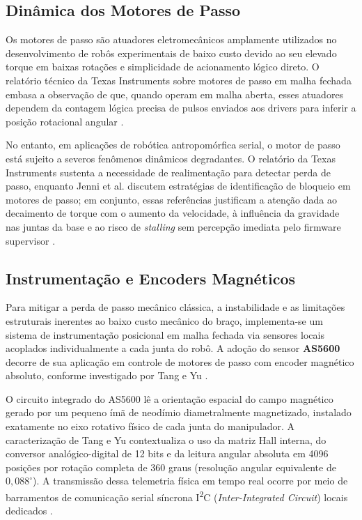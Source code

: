 \subsection{Dinâmica dos Motores de Passo}
\label{subsec:motores_passo}

Os motores de passo são atuadores eletromecânicos amplamente utilizados no desenvolvimento de robôs experimentais de baixo custo devido ao seu elevado torque em baixas rotações e simplicidade de acionamento lógico direto. O relatório técnico da Texas Instruments sobre motores de passo em malha fechada embasa a observação de que, quando operam em malha aberta, esses atuadores dependem da contagem lógica precisa de pulsos enviados aos drivers para inferir a posição rotacional angular \cite{ti2020closed}.

No entanto, em aplicações de robótica antropomórfica serial, o motor de passo está sujeito a severos fenômenos dinâmicos degradantes. O relatório da Texas Instruments sustenta a necessidade de realimentação para detectar perda de passo, enquanto Jenni et al. discutem estratégias de identificação de bloqueio em motores de passo; em conjunto, essas referências justificam a atenção dada ao decaimento de torque com o aumento da velocidade, à influência da gravidade nas juntas da base e ao risco de \textit{stalling} sem percepção imediata pelo firmware supervisor \cite{ti2020closed, jenni2014sensorless}.

\subsection{Instrumentação e Encoders Magnéticos}
\label{subsec:encoders_instrumentacao}

Para mitigar a perda de passo mecânico clássica, a instabilidade e as limitações estruturais inerentes ao baixo custo mecânico do braço, implementa-se um sistema de instrumentação posicional em malha fechada via sensores locais acoplados individualmente a cada junta do robô. A adoção do sensor \textbf{AS5600} decorre de sua aplicação em controle de motores de passo com encoder magnético absoluto, conforme investigado por Tang e Yu \cite{tang2022research}.

O circuito integrado do AS5600 lê a orientação espacial do campo magnético gerado por um pequeno ímã de neodímio diametralmente magnetizado, instalado exatamente no eixo rotativo físico de cada junta do manipulador. A caracterização de Tang e Yu contextualiza o uso da matriz Hall interna, do conversor analógico-digital de 12 bits e da leitura angular absoluta em 4096 posições por rotação completa de 360 graus (resolução angular equivalente de $0,088^{\circ}$). A transmissão dessa telemetria física em tempo real ocorre por meio de barramentos de comunicação serial síncrona I\textsuperscript{2}C (\textit{Inter-Integrated Circuit}) locais dedicados \cite{tang2022research}.

